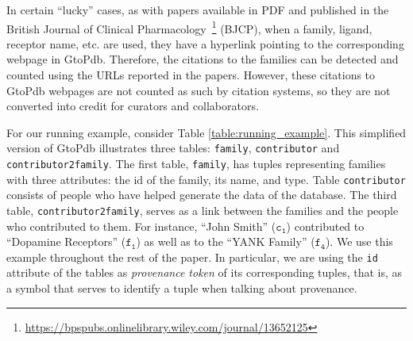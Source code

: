 In certain ``lucky'' cases, as with papers available in PDF and published in the British Journal of Clinical Pharmacology~\footnote{\url{https://bpspubs.onlinelibrary.wiley.com/journal/13652125}} (BJCP), when a  family, ligand, receptor name, etc. are used, they have a hyperlink pointing to the corresponding webpage in GtoPdb. Therefore, the citations to the families can be detected and counted using the URLs reported in the papers.
However, these citations to GtoPdb webpages are not counted as such by citation systems, so they are not converted into credit for curators and collaborators. 

For our running example, consider Table \ref{table:running_example}. This simplified version of GtoPdb illustrates three tables: \texttt{family}, \texttt{contributor} and \texttt{contributor2family}.
The first table, \texttt{family}, has tuples representing families with three attributes: the id of the family, its name, and type. 
Table \texttt{contributor} consists of people who have helped generate the data of the database.
The third table, \texttt{contributor2family}, serves as a link between the families and the people who contributed to them.
For instance, ``John Smith'' ($\mathtt{c_1}$) contributed to ``Dopamine Receptors'' ($\mathtt{f_1}$) as well as to the ``YANK Family'' ($\mathtt{f_4}$). We use this example throughout the rest of the paper. In particular, we are using the \texttt{id} attribute of the tables as \emph{provenance token} of its corresponding tuples, that is, as a symbol that serves to identify a tuple when talking about provenance.


